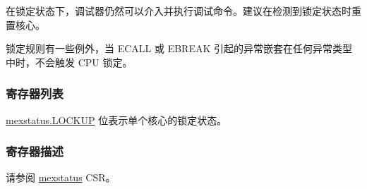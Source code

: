 \documentclass[main\_\_CN.tex]{subfiles}
\begin{document}
在锁定状态下，调试器仍然可以介入并执行调试命令。建议在检测到锁定状态时重置核心。

锁定规则有一些例外，当 ECALL 或 EBREAK 引起的异常嵌套在任何异常类型中时，不会触发 CPU 锁定。

\subsubsection{寄存器列表}
\label{sec:riscvcpu-custom-lockup-reg-summ}

\hyperref[fielddesc:MEXSTATUS_LOCKUP]{mexstatus.LOCKUP} 位表示单个核心的锁定状态。

\subsubsection{寄存器描述}
\label{sec:riscvcpu-custom-lockup-reg-desc}
请参阅 \hyperref[regdesc:MEXSTATUS]{mexstatus} CSR。
\end{document}
